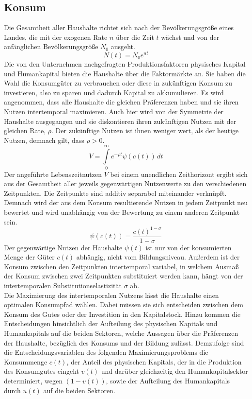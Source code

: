 \subsection*{Konsum}
Die Gesamtheit aller Haushalte richtet sich nach der Bevölkerungsgröße eines Landes, die mit der exogenen Rate $n$ über die Zeit $t$ wächst und von der anfänglichen Bevölkerungsgröße $N_0$ ausgeht.  
%
\begin{equation}
	N(t)=N_0e^{nt}
	\label{eq:Bevolkerungsentwickung}
\end{equation}
%
Die von den Unternehmen nachgefragten Produktionsfaktoren physisches Kapital und Humankapital bieten die Haushalte über die Faktormärkte an. Sie haben die Wahl die Konsumgüter zu verbrauchen oder diese in zukünftigen Konsum zu investieren, also zu sparen und dadurch Kapital zu akkumulieren. 
Es wird angenommen, dass alle Haushalte die gleichen Präferenzen haben und sie ihren Nutzen intertemporal maximieren. Auch hier wird von der Symmetrie der Haushalte ausgegangen und sie diskontieren ihren zukünftigen Nutzen mit der gleichen Rate, $\rho$. Der zukünftige Nutzen ist ihnen weniger wert, als der heutige Nutzen, demnach gilt, dass $\rho>0$. 
%
\begin{equation}
	V=\int \limits_{0}^\infty  \! e^{-\rho t}\psi(c(t)) \, dt
\end{equation}
%
Der angeführte Lebenszeitnutzen $V$ bei einem unendlichen Zeithorizont ergibt sich aus der Gesamtheit aller jeweils gegenwärtigen Nutzenwerte zu den verschiedenen Zeitpunkten. Die Zeitpunkte sind additiv separabel miteinander verknüpft. Demnach wird der aus dem Konsum resultierende Nutzen in jedem Zeitpunkt neu bewertet und wird unabhängig von der Bewertung zu einem anderen Zeitpunkt sein.
%
\begin{equation}
	\psi(c(t))=\frac{c(t)^{1-\sigma}}{1-\sigma}
\end{equation} 
%
Der gegenwärtige Nutzen der Haushalte $\psi(t)$ ist nur von der konsumierten Menge der Güter $c(t)$ abhängig, nicht vom Bildungsniveau. Außerdem ist der Konsum zwischen den Zeitpunkten intertemporal variabel, in welchem Ausmaß der Konsum zwischen zwei Zeitpunkten substituiert werden kann, hängt von der intertemporalen Substitutionselastizität $\sigma$ ab.\\
%
Die Maximierung des intertemporalen Nutzens lässt die Haushalte einen optimalen Konsumpfad wählen. Dabei müssen sie sich entscheiden zwischen dem Konsum  des Gutes oder der Investition in den Kapitalstock. Hinzu kommen die Entscheidungen hinsichtlich der Aufteilung des physischen Kapitals und Humankapitals auf die beiden Sektoren, welche Aussagen über die Präferenzen der Haushalte, bezüglich des Konsums und der Bildung zulässt. Demzufolge sind die Entscheidungsvariablen des folgenden Maximierungsproblems die Konsummenge $c(t)$, der Anteil des physischen Kapitals, der in die Produktion des Konsumgutes eingeht $v(t)$ und darüber gleichzeitig den Humankapitalsektor determiniert, wegen $(1-v(t))$, sowie der Aufteilung des Humankapitals durch $u(t)$ auf die beiden Sektoren.\\
